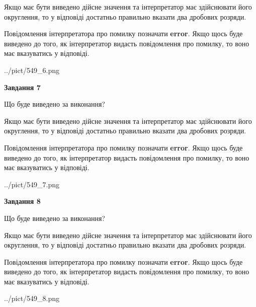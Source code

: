 \documentclass[12pt, ukrainian]{article}
\begin{document}
{\begin {Large}
Якщо має бути виведено дійсне значення та інтерпретатор має здійснювати його округлення, 
то у відповіді достатньо правильно вказати два дробових розряди.

Повідомлення інтерпретатора про помилку позначати \textbf{error}.
Якщо щось буде виведено до того, як інтерпретатор видасть повідомлення про помилку, 
то воно має вказуватись у відповіді. \par

\begin{center}
	{../pict/549_6.png}
\end{center}
\newpage

{\begin {center}\textbf{Завдання 7}\end {center}}\par
Що буде виведено за виконання? \par

Якщо має бути виведено дійсне значення та інтерпретатор має здійснювати його округлення, 
то у відповіді достатньо правильно вказати два дробових розряди.

Повідомлення інтерпретатора про помилку позначати \textbf{error}.
Якщо щось буде виведено до того, як інтерпретатор видасть повідомлення про помилку, 
то воно має вказуватись у відповіді. \par

\begin{center}
	{../pict/549_7.png}
\end{center}
\newpage

{\begin {center}\textbf{Завдання 8}\end {center}}\par
Що буде виведено за виконання? \par

Якщо має бути виведено дійсне значення та інтерпретатор має здійснювати його округлення, 
то у відповіді достатньо правильно вказати два дробових розряди.

Повідомлення інтерпретатора про помилку позначати \textbf{error}.
Якщо щось буде виведено до того, як інтерпретатор видасть повідомлення про помилку, 
то воно має вказуватись у відповіді. \par

\begin{center}
	{../pict/549_8.png}
\end{center}
\newpage


\end{Large}}
\end{document}
